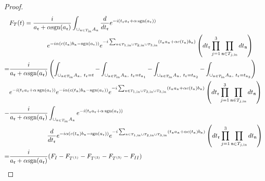 \begin{proof}
\begingroup
\allowdisplaybreaks
\begin{align}\label{eq.lemboundcoefexpand}
    &F_{T}(t)=\frac{i}{a_{\mathfrak{r}}+\alpha \text{sgn}(a_{\mathfrak{r}}) }\int_{\cup_{\mathfrak{n}\in T_{\text{in}}} A_{\mathfrak{n}}} \frac{d}{dt_{\mathfrak{r}}}e^{-i(t_{\mathfrak{r}}a_{\mathfrak{r}}+\alpha\, \text{sgn}(a_{\mathfrak{r}}))} \notag
    \\
    &\qquad\qquad\qquad e^{-i\alpha(c(t_{\mathfrak{n}}) b_{\mathfrak{n}}- \text{sgn}(a_{\mathfrak{r}}))} e^{-i\sum_{\mathfrak{n}\in T_{1,\text{in}}\cup T_{2,\text{in}}\cup T_{3,\text{in}}} (t_{\mathfrak{n}}a_{\mathfrak{n}}+\alpha c(t_{\mathfrak{n}}) b_{\mathfrak{n}})}  \left(dt_{\mathfrak{r}}\prod_{j=1}^3\prod_{\mathfrak{n}\in T_{j,\text{in}}}dt_{\mathfrak{n}}  \right)\notag
    \\
    =&\frac{i}{a_{\mathfrak{r}}+\alpha \text{sgn}(a_{\mathfrak{r}}) }\left(\int_{\cup_{\mathfrak{n}\in T_{\text{in}}} A_{\mathfrak{n}},\ t_{\mathfrak{r}}=t}-\int_{\cup_{\mathfrak{n}\in T_{\text{in}}} A_{\mathfrak{n}},\ t_{\mathfrak{r}}=t_{\mathfrak{n}_1}}-\int_{\cup_{\mathfrak{n}\in T_{\text{in}}} A_{\mathfrak{n}},\ t_{\mathfrak{r}}=t_{\mathfrak{n}_2}}-\int_{\cup_{\mathfrak{n}\in T_{\text{in}}} A_{\mathfrak{n}},\ t_{\mathfrak{r}}=t_{\mathfrak{n}_3}}\right) \notag
    \\
    & e^{-i(t_{\mathfrak{r}}a_{\mathfrak{r}}+\alpha\, \text{sgn}(a_{\mathfrak{r}}))}e^{-i\alpha(c(t_{\mathfrak{n}}) b_{\mathfrak{n}}- \text{sgn}(a_{\mathfrak{r}}))} e^{-i\sum_{\mathfrak{n}\in T_{1,\text{in}}\cup T_{2,\text{in}}\cup T_{3,\text{in}}} (t_{\mathfrak{n}}a_{\mathfrak{n}}+\alpha c(t_{\mathfrak{n}}) b_{\mathfrak{n}})}  \left(dt_{\mathfrak{r}}\prod_{j=1}^3\prod_{\mathfrak{n}\in T_{j,\text{in}}}dt_{\mathfrak{n}}  \right) 
    \\
    -&\frac{i}{a_{\mathfrak{r}}+\alpha \text{sgn}(a_{\mathfrak{r}}) }\int_{\cup_{\mathfrak{n}\in T_{\text{in}}} A_{\mathfrak{n}}} e^{-i(t_{\mathfrak{r}}a_{\mathfrak{r}}+\alpha\, \text{sgn}(a_{\mathfrak{r}}))} \notag
    \\
    &\qquad\qquad\qquad \frac{d}{dt_{\mathfrak{r}}}e^{-i\alpha(c(t_{\mathfrak{n}}) b_{\mathfrak{n}}- \text{sgn}(a_{\mathfrak{r}}))} e^{-i\sum_{\mathfrak{n}\in T_{1,\text{in}}\cup T_{2,\text{in}}\cup T_{3,\text{in}}} (t_{\mathfrak{n}}a_{\mathfrak{n}}+\alpha c(t_{\mathfrak{n}}) b_{\mathfrak{n}})}  \left(dt_{\mathfrak{r}}\prod_{j=1}^3\prod_{\mathfrak{n}\in T_{j,\text{in}}}dt_{\mathfrak{n}}  \right) \notag
    \\
    =& \frac{i}{a_{\mathfrak{r}}+\alpha \text{sgn}(a_{\mathfrak{r}}) }(F_{I}-F_{T^{(1)}}-F_{T^{(2)}}-F_{T^{(3)}}-F_{II})\notag
\end{align}
\endgroup









\end{proof}
